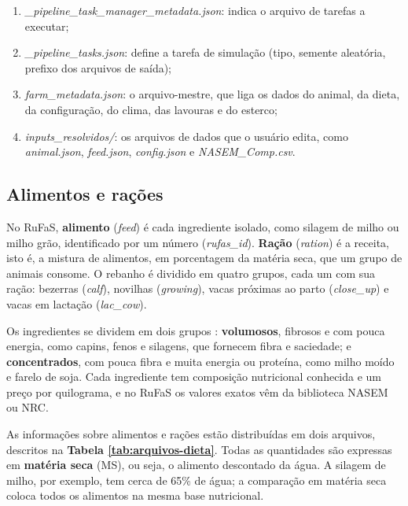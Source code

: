 \documentclass[a4paper,12pt]{article}
\begin{document}
\begin{enumerate}
    \item \textit{\_pipeline\_\allowbreak task\_\allowbreak manager\_\allowbreak metadata.json}: indica o arquivo de tarefas a executar;
    \item \textit{\_pipeline\_tasks.json}: define a tarefa de simulação (tipo, semente aleatória, prefixo dos arquivos de saída);
    \item \textit{farm\_metadata.json}: o arquivo-mestre, que liga os dados do animal, da dieta, da configuração, do clima, das lavouras e do esterco;
    \item \textit{inputs\_resolvidos/}: os arquivos de dados que o usuário edita, como \textit{animal.json}, \textit{feed.json}, \textit{config.json} e \textit{NASEM\_Comp.csv}.
\end{enumerate}

\subsection{Alimentos e rações}

No RuFaS, \textbf{alimento} (\textit{feed}) é cada ingrediente isolado, como silagem de milho ou milho grão, identificado por um número (\textit{rufas\_id}). \textbf{Ração} (\textit{ration}) é a receita, isto é, a mistura de alimentos, em porcentagem da matéria seca, que um grupo de animais consome. O rebanho é dividido em quatro grupos, cada um com sua ração: bezerras (\textit{calf}), novilhas (\textit{growing}), vacas próximas ao parto (\textit{close\_up}) e vacas em lactação (\textit{lac\_cow}).

Os ingredientes se dividem em dois grupos \cite{slides:rufas}: \textbf{volumosos}, fibrosos e com pouca energia, como capins, fenos e silagens, que fornecem fibra e saciedade; e \textbf{concentrados}, com pouca fibra e muita energia ou proteína, como milho moído e farelo de soja. Cada ingrediente tem composição nutricional conhecida e um preço por quilograma, e no RuFaS os valores exatos vêm da biblioteca NASEM ou NRC.

As informações sobre alimentos e rações estão distribuídas em dois arquivos, descritos na \textbf{Tabela \ref{tab:arquivos-dieta}}. Todas as quantidades são expressas em \textbf{matéria seca} (MS), ou seja, o alimento descontado da água. A silagem de milho, por exemplo, tem cerca de 65\% de água; a comparação em matéria seca coloca todos os alimentos na mesma base nutricional.
\end{document}
